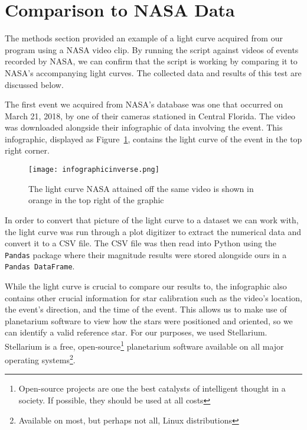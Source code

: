 \section{Comparison to NASA Data}

The methods section provided an example of a light curve acquired from our program using a NASA video clip. By running the script against videos of events recorded by NASA, we can confirm that the script is working by comparing it to NASA's accompanying light curves. The collected data and results of this test are discussed below.

The first event we acquired from NASA's database was one that occurred on March 21, 2018, by one of their cameras stationed in Central Florida. The video was downloaded alongside their infographic of data involving the event. This infographic, displayed as Figure~\ref{fig:infographic}, contains the light curve of the event in the top right corner. 
\begin{figure}[ht!]
	\centering
	\texttt{[image: infographicinverse.png]}
	\caption{The light curve NASA attained off the same video is shown in orange in the top right of the graphic\protect\cite{NASA2018}}
	\label{fig:infographic}
\end{figure}
In order to convert that picture of the light curve to a dataset we can work with, the light curve was run through a plot digitizer to extract the numerical data and convert it to a CSV file. The CSV file was then read into Python using the \texttt{Pandas} package where their magnitude results were stored alongside ours in a \texttt{Pandas DataFrame}.

While the light curve is crucial to compare our results to, the infographic also contains other crucial information for star calibration such as the video's location, the event's direction, and the time of the event. This allows us to make use of planetarium software to view how the stars were positioned and oriented, so we can identify a valid reference star. For our purposes, we used Stellarium. Stellarium is a free, open-source\footnote{Open-source projects are one the best catalysts of intelligent thought in a society. If possible, they should be used at all costs} planetarium software available on all major operating systems\footnote{Available on most, but perhaps not all, Linux distributions}.

